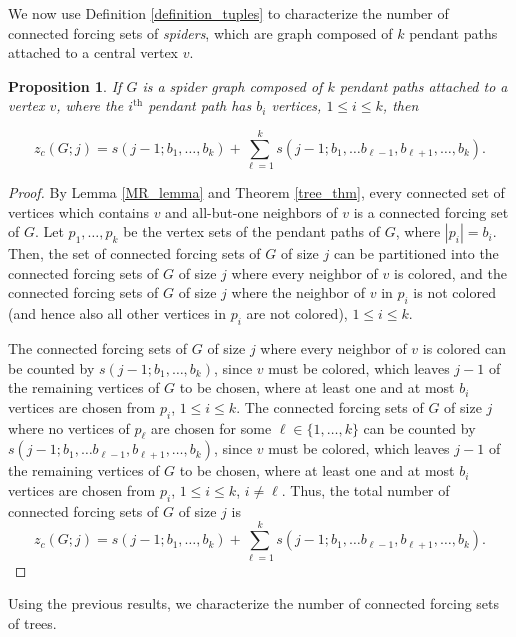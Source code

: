 \documentclass[11pt]{article}
\newtheorem{prop}[thm]{Proposition}
\theoremstyle{definition}
\newcommand{\1}{\vspace{0.1cm}}
\newcommand{\2}{\vspace{0.2cm}}
\newcommand{\3}{\vspace{0.3cm}}
\begin{document}
We now use Definition \ref{definition_tuples} to characterize the number of connected forcing sets of \emph{spiders}, which are graph composed of $k$ pendant paths attached to a central vertex $v$.

\begin{prop}
\label{prop_spider_cf}
If $G$ is a spider graph composed of $k$ pendant paths attached to a vertex $v$, where the $i^\text{th}$ pendant path has $b_i$ vertices, $1\leq i\leq k$, then

\begin{equation*}
z_c(G;j)=s(j-1;b_1,\ldots,b_k)+\sum_{\ell=1}^ks(j-1;b_1,\ldots b_{\ell-1},b_{\ell+1},\ldots,b_k).
\end{equation*}
\end{prop}
\begin{proof}
By Lemma \ref{MR_lemma} and Theorem \ref{tree_thm}, every connected set of vertices which contains $v$ and all-but-one neighbors of $v$ is a connected forcing set of $G$. Let $p_1,\ldots,p_k$ be the vertex sets of the pendant paths of $G$, where $|p_i|=b_i$. Then, the set of connected forcing sets of $G$ of size $j$ can be partitioned into the connected forcing sets of $G$ of size $j$ where every neighbor of $v$ is colored, and the connected forcing sets of $G$ of size $j$ where the neighbor of $v$ in $p_i$ is not colored (and hence also all other vertices in $p_i$ are not colored), $1\leq i\leq k$. 

The connected forcing sets of $G$ of size $j$ where every neighbor of $v$ is colored can be counted by $s(j-1;b_1,\ldots,b_k)$, since $v$ must be colored, which leaves $j-1$ of the remaining vertices of $G$ to be chosen, where at least one and at most $b_i$ vertices are chosen from $p_i$, $1\leq i\leq k$. The connected forcing sets of $G$ of size $j$ where no vertices of $p_\ell$ are chosen for some $\ell\in\{1,\ldots,k\}$ can be counted by $s(j-1;b_1,\ldots b_{\ell-1},b_{\ell+1},\ldots,b_k)$, since $v$ must be colored, which leaves $j-1$ of the remaining vertices of $G$ to be chosen, where at least one and at most $b_i$ vertices are chosen from $p_i$, $1\leq i\leq k$, $i\neq \ell$. Thus, the total number of connected forcing sets of $G$ of size $j$ is 
\begin{equation*}
z_c(G;j)=s(j-1;b_1,\ldots,b_k)+\sum_{\ell=1}^ks(j-1;b_1,\ldots b_{\ell-1},b_{\ell+1},\ldots,b_k).
\end{equation*}
\end{proof}

\noindent Using the previous results, we characterize the number of connected forcing sets of trees. 
\end{document}
